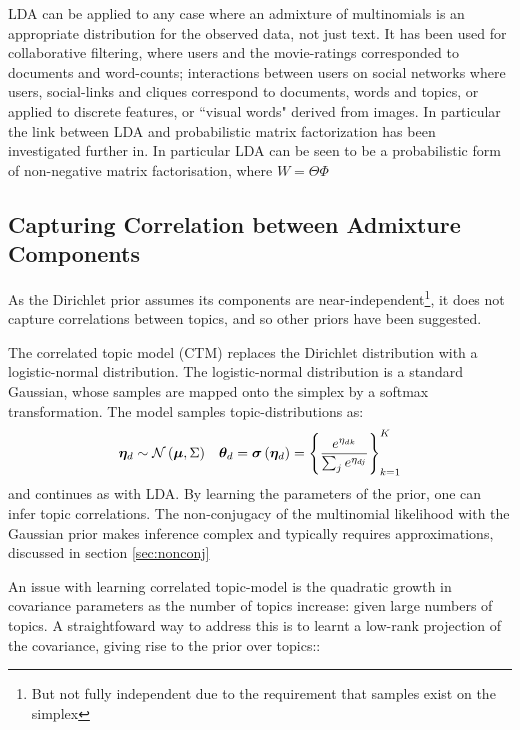 LDA can be applied to any case where an admixture of multinomials is an appropriate distribution for the observed data, not just text. It has been used for collaborative filtering\cite{BleiNgJordan2003}, where users and the movie-ratings corresponded to documents and word-counts; interactions between users on social networks where users, social-links and cliques correspond to documents, words and topics\cite{Zhang2007}, or applied to discrete features, or ``visual words" derived from images\cite{Philbin2008}. In particular the link between LDA and probabilistic matrix factorization\cite{Salakhutdinov2007} has been investigated further in\cite{Agarwal2010}. In particular LDA can be seen to be a probabilistic form of non-negative matrix factorisation\cite{Lin2007}, where $W = \Theta \Phi$


\subsection{Capturing Correlation between Admixture Components}

As the Dirichlet prior assumes its components are near-independent\footnote{But not fully independent due to the requirement that samples exist on the simplex}, it does not capture correlations between topics, and so other priors have been suggested.

The correlated topic model\cite{Blei2006} (CTM) replaces the Dirichlet distribution with a logistic-normal distribution.  The logistic-normal distribution is a standard Gaussian, whose samples are mapped onto the simplex by a softmax transformation. The model samples topic-distributions as:
\begin{align}
\bm \eta_d & \sim \mathcal{N} \left( {\bm \mu}, {\Sigma} \right) & { \bm \theta_d } = \bm \sigma\left(\bm \eta_d\right) = \left\{\frac{e^{\eta_{dk}}}{\sum_j e^{\eta_{dj}}}\right\}_{k=1}^K
\end{align}
and continues as with LDA. By learning the parameters of the prior, one can infer topic correlations. The non-conjugacy of the multinomial likelihood with the Gaussian prior makes inference complex and typically requires approximations, discussed in section \ref{sec:nonconj}

An issue with learning correlated topic-model is the quadratic growth in covariance parameters as the number of topics increase: given large numbers of topics. A straightfoward way to address this is to learnt a low-rank projection of the covariance, giving rise to the prior over topics:\cite{Putthividhya2009}:

